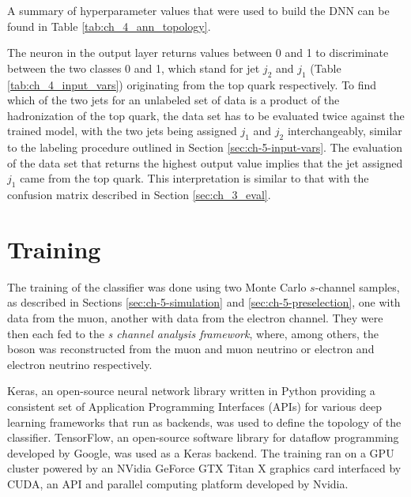 A summary of hyperparameter values that were used to build the DNN can be found in Table \ref{tab:ch_4_ann_topology}.

The neuron in the output layer returns values between 0 and 1 to discriminate between the two classes 0 and 1, which stand for jet $j_2$ and $j_1$ (Table \ref{tab:ch_4_input_vars}) originating from the top quark respectively. To find which of the two jets for an unlabeled set of data is a product of the hadronization of the top quark, the data set has to be evaluated twice against the trained model, with the two jets being assigned $j_1$ and $j_2$ interchangeably, similar to the labeling procedure outlined in Section \ref{sec:ch-5-input-vars}. The evaluation of the data set that returns the highest output value implies that the jet assigned $j_1$ came from the top quark. This interpretation is similar to that with the confusion matrix described in Section \ref{sec:ch_3_eval}.

\section{Training}
\label{sec:ch-5-training}
The training of the classifier was done using two Monte Carlo $s$-channel samples, as described in Sections \ref{sec:ch-5-simulation} and \ref{sec:ch-5-preselection}, one with data from the muon, another with data from the electron channel. They were then each fed to the \emph{s channel analysis framework}, where, among others, the \PWplus boson was reconstructed from the muon and muon neutrino or electron and electron neutrino respectively.

Keras, an open-source neural network library written in Python providing a consistent set of Application Programming Interfaces (APIs) for various deep learning frameworks that run as backends, was used to define the topology of the classifier. TensorFlow, an open-source software library for dataflow programming developed by Google, was used as a Keras backend. The training ran on a GPU cluster powered by an NVidia GeForce GTX Titan X \cite{misc:geforce} graphics card interfaced by CUDA, an API and parallel computing platform developed by Nvidia.

